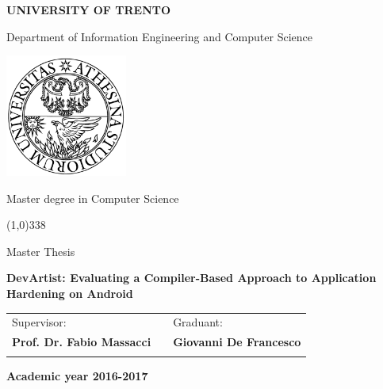\begin{titlepage}
  \pagestyle{empty}

  \begin{center}
    {\bfseries\Large {\huge U}NIVERSITY OF {\huge T}RENTO}

    \vspace{0.2cm}

    {\large Department of Information Engineering and Computer Science}

    \vspace{0.5cm}

    \begin{center}
      \includegraphics[width=0.3\textwidth]{img/logo_unitn.png}
    \end{center}

    \vspace{0.5cm}

    {\Large Master degree in Computer Science}

    \vspace{0.2cm}
    \line(1,0){338}
    \vspace{0.5cm}

    {\Large Master Thesis}

    \vspace{2.0cm}

    {\Large \bfseries {DevArtist: Evaluating a Compiler-Based Approach to Application Hardening on Android}}

    \vspace{0.3cm}
    

    \large
    \begin{center}
      \begin{tabular}{lcl}
        Supervisor: & \hspace{4cm} &  \hspace{1.5cm} Graduant: \\
        {\bfseries Prof. Dr. Fabio Massacci} & \hspace{2cm} & {\bfseries Giovanni De Francesco } \\ \\
      \end{tabular}
    \end{center}
    \vspace{2.0cm}

    {\large \bfseries Academic year 2016-2017}
    \vfill

  \end{center}

\end{titlepage}

\addtocounter{page}{-1}
\newpage

